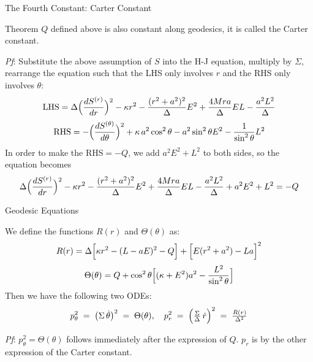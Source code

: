 \documentclass{beamer}
\begin{document}
\begin{frame}{The Fourth Constant: Carter Constant}
  \begin{block}{Theorem}
    $Q$ defined above is also constant along geodesics, it is called the Carter constant.
  \end{block}

  \textit{Pf}:
  Substitute the above assumption of $S$ into the H-J equation, multiply by $\Sigma$, rearrange the equation such that the LHS only involves $r$ and the RHS only involves $\theta$:
  \begin{equation}
      \text{LHS}=\Delta\Bigl(\frac{dS^{(r)}}{dr}\Bigr)^2- \kappa r^2
    - \frac{(r^2 + a^2)^2}{\Delta}E^2
    + \frac{4Mra}{\Delta}EL
    - \frac{a^2L^2}{\Delta}
  \end{equation}
  \begin{equation}
      \text{RHS}=-\Bigl(\frac{dS^{(\theta)}}{d\theta}\Bigr)^2
    + \kappa\,a^2\cos^2\theta
    - a^2\sin^2\theta E^2
    - \frac{1}{\sin^2\theta}L^2
  \end{equation}
In order to make the RHS$=-Q$, we add $a^2E^2+L^2$ to both sides, so the equation becomes
\begin{equation}
    \Delta\Bigl(\frac{dS^{(r)}}{dr}\Bigr)^2
    -\kappa r^2
    -\frac{(r^2 + a^2)^2}{\Delta}E^2
    +\frac{4Mra}{\Delta}EL
    -\frac{a^2 L^2}{\Delta} +a^2 E^2 +L^2 = -Q
\end{equation}

\end{frame}

\begin{frame}{Geodesic Equations}
\begin{lemma}
We define the functions $R(r)$ and $\Theta(\theta)$ as:
    \begin{equation}
        R(r)=\Delta\Bigl[\kappa r^2-(L - aE)^2-Q\Bigr]
        +\Bigl[E(r^2 + a^2)-La\Bigr]^2
    \end{equation}
    \begin{equation}
        \Theta(\theta)=Q+\cos^2\theta
        \Bigl[(\kappa + E^2)a^2-\frac{L^2}{\sin^2\theta}\Bigr]
    \end{equation}
    Then we have the following two ODEs:
    \begin{equation}
        p_{\theta}^2 \;=\; \bigl(\Sigma\,\dot{\theta}\bigr)^2 \;=\; \Theta(\theta),
        \quad
        p_{r}^2 \;=\; \Bigl(\tfrac{\Sigma}{\Delta}\,\dot{r}\Bigr)^2 \;=\; \tfrac{R(r)}{\Delta^2}
    \end{equation}
\end{lemma}
\textit{Pf}:
$p_{\theta}^2=\Theta(\theta)$ follows immediately after the expression of $Q$. $p_r$ is by the other expression of the Carter constant.
\end{frame}
\end{document}
